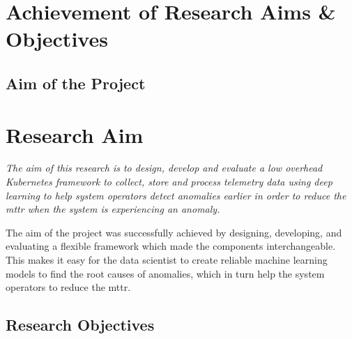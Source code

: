 \section{Achievement of Research Aims \& Objectives}

\subsection{Aim of the Project}

\section{Research Aim}

\textit{The aim of this research is to design, develop and evaluate a low overhead Kubernetes framework to collect, store and process telemetry data using deep learning to help system operators detect anomalies earlier in order to reduce the \ac{mttr} when the system is experiencing an anomaly.}

The aim of the project was successfully achieved by designing, developing, and evaluating a flexible framework which made the components interchangeable. This makes it easy for the data scientist to create reliable machine learning models to find the root causes of anomalies, which in turn help the system operators to reduce the \ac{mttr}.


\subsection{Research Objectives}

